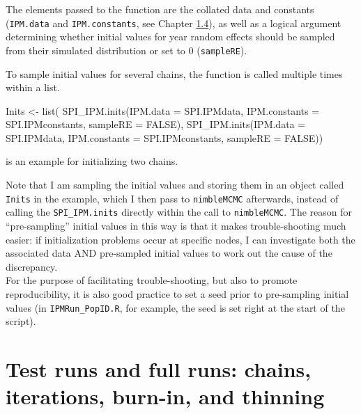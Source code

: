\documentclass[
]{book}
\newenvironment{Shaded}{\begin{snugshade}}{\end{snugshade}}
\newcommand{\AttributeTok}[1]{\textcolor[rgb]{0.77,0.63,0.00}{#1}}
\newcommand{\ConstantTok}[1]{\textcolor[rgb]{0.00,0.00,0.00}{#1}}
\newcommand{\FunctionTok}[1]{\textcolor[rgb]{0.00,0.00,0.00}{#1}}
\newcommand{\NormalTok}[1]{#1}
\newcommand{\OtherTok}[1]{\textcolor[rgb]{0.56,0.35,0.01}{#1}}
\begin{document}
The elements passed to the function are the collated data and constants
(\texttt{IPM.data} and \texttt{IPM.constants}, see Chapter \protect\hyperlink{ux5cux23ux5cux2520Organisationux5cux2520forux5cux2520analysisux5cux2520withux5cux2520NIMBLE}{1.4}),
as well as a logical argument determining whether initial values for year random
effects should be sampled from their simulated distribution or set to 0 (\texttt{sampleRE}).

To sample initial values for several chains, the function is called multiple
times within a list.

\begin{Shaded}
\begin{Highlighting}[]
\NormalTok{Inits }\OtherTok{\textless{}{-}} \FunctionTok{list}\NormalTok{(}
  \FunctionTok{SPI\_IPM.inits}\NormalTok{(}\AttributeTok{IPM.data =}\NormalTok{ SPI.IPMdata, }\AttributeTok{IPM.constants =}\NormalTok{ SPI.IPMconstants, }\AttributeTok{sampleRE =} \ConstantTok{FALSE}\NormalTok{),}
  \FunctionTok{SPI\_IPM.inits}\NormalTok{(}\AttributeTok{IPM.data =}\NormalTok{ SPI.IPMdata, }\AttributeTok{IPM.constants =}\NormalTok{ SPI.IPMconstants, }\AttributeTok{sampleRE =} \ConstantTok{FALSE}\NormalTok{))}
\end{Highlighting}
\end{Shaded}

is an example for initializing two chains.

Note that I am sampling the initial values and storing them in an object called
\texttt{Inits} in the example, which I then pass to \texttt{nimbleMCMC} afterwards, instead of
calling the \texttt{SPI\_IPM.inits} directly within the call to \texttt{nimbleMCMC}. The reason
for ``pre-sampling'' initial values in this way is that it makes trouble-shooting
much easier: if initialization problems occur at specific nodes, I can
investigate both the associated data AND pre-sampled initial values to work out
the cause of the discrepancy.\\
For the purpose of facilitating trouble-shooting, but also to promote reproducibility,
it is also good practice to set a seed prior to pre-sampling initial values
(in \texttt{IPMRun\_PopID.R}, for example, the seed is set right at the start of the
script).

\hypertarget{test-runs-and-full-runs-chains-iterations-burn-in-and-thinning}{%
\section{Test runs and full runs: chains, iterations, burn-in, and thinning}\label{test-runs-and-full-runs-chains-iterations-burn-in-and-thinning}}
\end{document}
